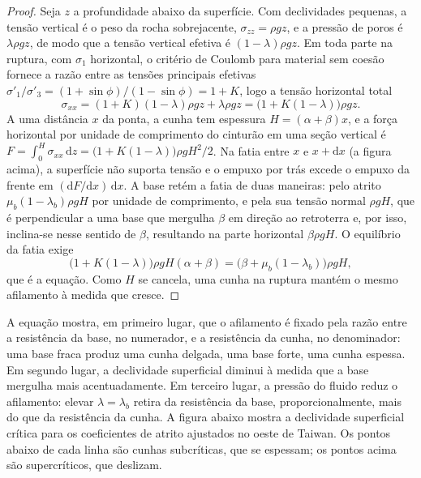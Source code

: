 \begin{proof}
Seja $z$ a profundidade abaixo da superfície. Com declividades pequenas, a tensão vertical
é o peso da rocha sobrejacente, $\sigma_{zz} = \rho g z$, e a pressão de poros
é $\lambda\rho g z$, de modo que a tensão vertical efetiva é
$(1 - \lambda)\rho g z$. Em toda parte na ruptura, com $\sigma_1$ horizontal,
o critério de Coulomb para material sem coesão fornece a razão entre as
tensões principais efetivas $\sigma'_1/\sigma'_3 = (1 + \sin\phi)/(1 -
\sin\phi) = 1 + K$, logo a tensão horizontal total
\[
  \sigma_{xx} = (1 + K)(1 - \lambda)\rho g z + \lambda\rho g z
  = \bigl(1 + K(1 - \lambda)\bigr)\rho g z .
\]
A uma distância $x$ da ponta, a cunha tem espessura $H = (\alpha +
\beta)x$, e a força horizontal por unidade de comprimento do cinturão em uma seção vertical
é $F = \int_0^H \sigma_{xx}\,\mathrm dz = \bigl(1 + K(1 -
\lambda)\bigr)\rho g H^2/2$. Na fatia entre $x$ e $x + \mathrm dx$
(a figura acima), a superfície não suporta tensão e o empuxo por trás
excede o empuxo da frente em $(\mathrm dF/\mathrm dx)\,\mathrm dx$.
A base retém a fatia de duas maneiras: pelo atrito $\mu_b(1 -
\lambda_b)\rho g H$ por unidade de comprimento, e pela sua tensão normal $\rho g H$, que
é perpendicular a uma base que mergulha $\beta$ em direção ao retroterra e, por isso,
inclina-se nesse sentido de $\beta$, resultando na parte horizontal $\beta\rho g H$.
O equilíbrio da fatia exige
\[
  \bigl(1 + K(1 - \lambda)\bigr)\rho g H(\alpha + \beta)
  = \bigl(\beta + \mu_b(1 - \lambda_b)\bigr)\rho g H ,
\]
que é a equação. Como $H$ se cancela, uma cunha na ruptura mantém o mesmo
afilamento à medida que cresce.
\end{proof}

A equação mostra, em primeiro lugar, que o afilamento é fixado pela razão entre a resistência
da base, no numerador, e a resistência da cunha, no
denominador: uma base fraca produz uma cunha delgada, uma base forte, uma cunha espessa.
Em segundo lugar, a declividade superficial diminui à medida que a base mergulha mais acentuadamente. Em terceiro lugar, a pressão do fluido
reduz o afilamento: elevar $\lambda = \lambda_b$ retira da
resistência da base, proporcionalmente, mais do que da resistência da
cunha. A figura abaixo mostra a declividade superficial crítica para os coeficientes de atrito
ajustados no oeste de Taiwan. Os pontos abaixo de cada linha são cunhas subcríticas,
que se espessam; os pontos acima são supercríticos, que deslizam.

